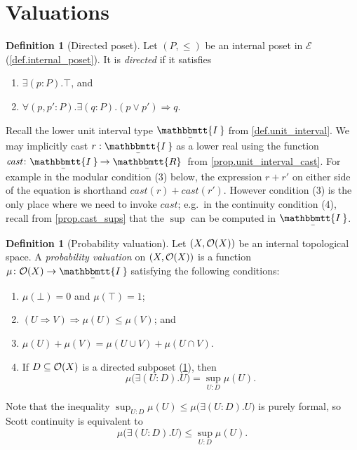 \documentclass[11pt, oneside, article]{memoir}
\theoremstyle{plain}
\theoremstyle{definition}
\newtheorem{definition}[theorem]{Definition}
\theoremstyle{remark}
\renewcommand{\ss}{\subseteq}
\newcommand{\cat}[1]{\mathcal{#1}}
\newcommand{\ubar}[1]{\underaccent{\bar}{#1}}
\newcommand{\internal}[1]{\raisebox{-.03ex}{$\mathbbmtt{#1}$}}
\newcommand{\hs}{\hspace{1.1pt}}
\newcommand{\trr}{\internal{R}\hs}
\newcommand{\tii}{\ubar{\internal{I\hs\hs}}\!\hs}
\newcommand{\tlrr}{\ubar{\trr}\hs}
\newcommand{\cast}{\textit{cast}}
\newcommand{\Op}[1][undef]{\ifthenelse{\equal{#1}{undef}}{\mathcal{O}}{\mathcal{O}(#1)}}
\newcommand{\imp}{\Rightarrow}
\begin{document}
\section{Valuations}\label{sec.valuations}

\begin{definition}[Directed poset]\label{def.directed}
Let $(P,\leq)$ be an internal poset in $\cat{E}$ (\cref{def.internal_poset}). It is \emph{directed} if it satisfies
\begin{enumerate}
	\item $\exists(p:P).\top$, and
	\item $\forall(p,p':P).\exists(q:P).(p\vee p')\imp q$.
\end{enumerate}
\end{definition}


Recall the lower unit interval type $\tii$ from \cref{def.unit_interval}. We may implicitly cast $r:\tii$ as a lower real using the function $\cast\colon\tii\to\tlrr$ from \cref{prop.unit_interval_cast}. For example in the modular condition (3) below, the expression $r+r'$ on either side of the equation is shorthand $\cast(r)+\cast(r')$. However condition (3) is the only place where we need to invoke $\cast$; e.g.\ in the continuity condition (4), recall from \cref{prop.cast_sups} that the $\sup$ can be computed in $\tii$.

\begin{definition}[Probability valuation]\label{def.prob_valuation}
Let $(X,\Op[X])$ be an internal topological space. A \emph{probability valuation} on $(X,\Op[X])$ is a function $\mu\colon\Op[X]\to\tii$ satisfying the following conditions:
\begin{enumerate}
	\item $\mu(\bot)=0$ and $\mu(\top)=1$;
	\item $(U\imp V)\imp\mu(U)\leq\mu(V)$; and
	\item $\mu(U)+\mu(V)=\mu(U\cup V)+\mu(U\cap V)$.
	\item If $D\ss\Op[X]$ is a directed subposet (\cref{def.directed}), then
\[
	\mu\big(\exists(U:D).U\big)= \sup_{U: D}\mu(U).
\]
\end{enumerate}
\end{definition}
Note that the inequality $\sup_{U: D}\mu(U)\leq\mu\big(\exists(U:D).U\big)$ is purely formal, so Scott continuity is equivalent to
\begin{equation}\label{eqn.scott_continuity}
	\mu\big(\exists(U:D).U\big)\leq\sup_{U: D}\mu(U).
\end{equation}
\end{document}
